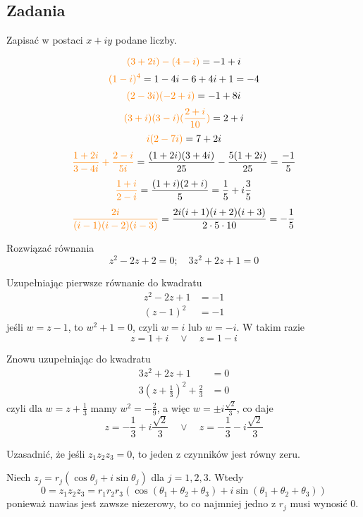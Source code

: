\subsection{Zadania}

\begin{problem}
  Zapisać w postaci $x+iy$ podane liczby.
  \begin{multicols*}{2}
    $${\color{orange}(3+2i)-(4-i)}=-1+i$$
    $${\color{orange}(1-i)^4}=1-4i-6+4i+1=-4$$
    $${\color{orange}(2-3i)(-2+i)}=-1+8i$$
    $${\color{orange}(3+i)(3-i)(\frac{2+i}{10})}=2+i$$
    $${\color{orange}i(2-7i)}=7+2i$$
    $${\color{orange}\frac{1+2i}{3-4i}+\frac{2-i}{5i}}=\frac{(1+2i)(3+4i)}{25}-\frac{5(1+2i)}{25}=\frac{-1}{5}$$
    $${\color{orange}\frac{1+i}{2-i}}=\frac{(1+i)(2+i)}{5}=\frac{1}{5}+i\frac{3}{5}$$
    $${\color{orange}\frac{2i}{(i-1)(i-2)(i-3)}}=\frac{2i(i+1)(i+2)(i+3)}{2\cdot 5\cdot 10}=-\frac{1}{5}$$
  \end{multicols*}
\end{problem}

\begin{problem}
  Rozwiązać równania
  $$z^2-2z+2=0;\quad 3z^2+2z+1=0$$
\end{problem}

\begin{solution}
  Uzupełniając pierwsze równanie do kwadratu
  \begin{align*}
    z^2-2z+1&=-1\\ 
    (z-1)^2&=-1
  \end{align*}
  jeśli $w=z-1$, to $w^2+1=0$, czyli $w=i$ lub $w=-i$. W takim razie
  $$z=1+i\quad\lor\quad z=1-i$$

  Znowu uzupełniając do kwadratu
  \begin{align*}
    3z^2+2z+1&=0\\ 
    3\left(z+\frac{1}{3}\right)^2+\frac{2}{3}&=0
  \end{align*}
  czyli dla $w=z+\frac{1}{3}$ mamy $w^2=-\frac{2}{9}$, a więc $w=\pm i\frac{\sqrt{2}}{3}$, co daje
  $$z=-\frac{1}{3}+i\frac{\sqrt2}{3}\quad\lor\quad z=-\frac{1}{3}-i\frac{\sqrt2}{3}$$
\end{solution}

\begin{problem}
  Uzasadnić, że jeśli $z_1z_2z_3=0$, to jeden z czynników jest równy zeru.
\end{problem}

\begin{solution}
%
  Niech $z_j=r_j(\cos\theta_j+i\sin\theta_j)$ dla $j=1,2,3$. Wtedy
  $$0=z_1z_2z_3=r_1r_2r_3(\cos(\theta_1+\theta_2+\theta_3)+i\sin(\theta_1+\theta_2+\theta_3))$$
  ponieważ nawias jest zawsze niezerowy, to co najmniej jedno z $r_j$ musi wynosić $0$.
\end{solution}

